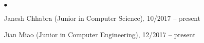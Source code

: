\documentclass[margin,line]{res}
\newenvironment{list2}{
  \begin{list}{$\bullet$}{%
      \setlength{\itemsep}{0in}
      \setlength{\parsep}{0in} \setlength{\parskip}{0in}
      \setlength{\topsep}{0in} \setlength{\partopsep}{0in}
      \setlength{\leftmargin}{0.10in}}}{\end{list}}
\begin{document}
\begin{resume}
\vspace{0.4cm}

\section{}

\begin{list2}
\item Janesh Chhabra (Junior in Computer Science), 10/2017 -- present
\item Jian Miao (Junior in Computer Engineering), 12/2017 -- present
\end{list2}


%
%
%
%
%
%
%

\end{resume}
\end{document}
